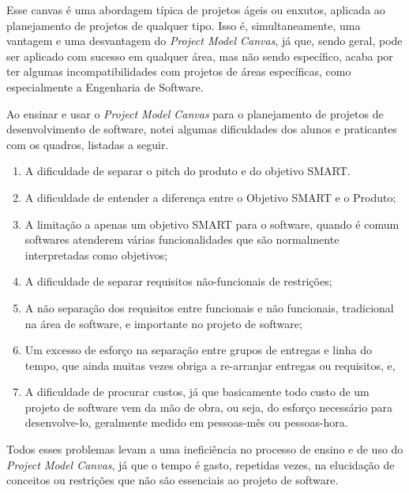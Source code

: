 \documentclass{article}
\begin{document}
Esse canvas é uma abordagem típica de projetos ágeis ou enxutos, aplicada ao planejamento de projetos de qualquer tipo. Isso é, simultaneamente, uma vantagem e uma desvantagem do \textit{Project Model Canvas}, já que, sendo geral, pode ser aplicado com sucesso em qualquer área, mas não sendo específico, acaba por ter algumas incompatibilidades com projetos de áreas específicas, como especialmente a Engenharia de Software.

Ao ensinar e usar o \textit{Project Model Canvas} para o planejamento de projetos de desenvolvimento de software, notei algumas dificuldades dos alunos e praticantes com os quadros, listadas a seguir.

\begin{enumerate}
    \item A dificuldade de separar o pitch do produto e do objetivo SMART.
    \item A dificuldade de entender a diferença entre o Objetivo SMART e o Produto;
    \item A limitação a apenas um objetivo SMART para o software, quando é comum softwares atenderem várias funcionalidades que são normalmente interpretadas como objetivos;
    \item A dificuldade de separar requisitos não-funcionais de restrições;
    \item A não separação dos requisitos entre funcionais e não funcionais, tradicional na área de software, e importante no projeto de software;
    \item Um excesso de esforço na separação entre grupos de entregas e linha do tempo, que ainda muitas vezes obriga a re-arranjar entregas ou requisitos, e,
    \item \label{problems:total} A dificuldade de procurar custos, já que basicamente todo custo de um projeto de software vem da mão de obra, ou seja, do esforço necessário para desenvolve-lo, geralmente medido em pessoas-mês ou pessoas-hora.
\end{enumerate}

Todos esses problemas levam a uma ineficiência no processo de ensino e de uso do \textit{Project Model Canvas}, já que o tempo é gasto, repetidas vezes, na elucidação de conceitos ou restrições que não são essenciais ao projeto de software.
\end{document}
